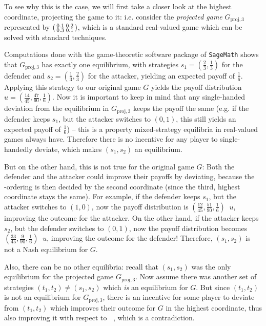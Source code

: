 \documentclass[a4paper]{scrreprt}
\DeclareMathOperator{\leqtail}{\leq_{\text{tail}}}
\DeclareMathOperator{\geqtail}{\geq_{\text{tail}}}
\begin{document}
    To see why this is the case, we will first take a closer look at the highest coordinate, projecting the game to it: i.e. consider the \emph{projected game} $G_{\text{proj},3}$ represented by $\left(\begin{smallmatrix}0.1 & 0.2 \\ 0.3 & 0.1\end{smallmatrix}\right)$, which is a standard real-valued game which can be solved with standard techniques.
    
    Computations done with the game-theoretic software package of \texttt{SageMath} %
    shows that $G_{\text{proj},3}$ has exactly one equilibrium, with strategies $s_1 = (\frac{2}{3}, \frac{1}{3})$ for the defender and $s_2 = (\frac{1}{3}, \frac{2}{3})$ for the attacker, yielding an expected payoff of $\frac{1}{6}$. Applying this strategy to our original game $G$ yields the payoff distribution $u = (\frac{14}{45}, \frac{47}{90}, \frac{1}{6})$. Now it is important to keep in mind that any single-handed deviation from the equilibrium in  $G_{\text{proj},3}$ keeps the payoff the same (e.g. if the defender keeps $s_1$, but the attacker switches to $(0, 1)$, this still yields an expected payoff of $\frac{1}{6}$) -- this is a property mixed-strategy equilibria in real-valued games always have. Therefore there is no incentive for any player to single-handedly deviate, which makes $(s_1, s_2)$ an equilibrium.
    
    But on the other hand, this is not true for the original game $G$: Both the defender and the attacker could improve their payoffs by deviating, because the $\leqtail$-ordering is then decided by the second coordinate (since the third, highest coordinate stays the same).
    For example, if the defender keeps $s_1$, but the attacker switches to $(1, 0)$, now the payoff distribution is $(\frac{12}{45}, \frac{51}{90}, \frac{1}{6}) \geqtail u$, improving the outcome for the attacker. On the other hand, if the attacker keeps $s_2$, but the defender switches to $(0, 1)$, now the payoff distribution becomes $(\frac{33}{45}, \frac{9}{90}, \frac{1}{6}) \leqtail u$, improving the outcome for the defender!
    Therefore, $(s_1, s_2)$ is not a Nash equilibrium for $G$.
    
    Also, there can be no other equilibria: recall that $(s_1, s_2)$ was the only equilibrium for the projected game $G_{\text{proj},3}$. Now assume there was another set of strategies $(t_1, t_2) \neq (s_1, s_2)$ which \emph{is} an equilibrium for $G$. But since $(t_1, t_2)$ is not an equilibrium for $G_{\text{proj},3}$, there is an incentive for some player to deviate from $(t_1, t_2)$ which improves their outcome for $G$ in the highest coordinate, thus also improving it with respect to $\leqtail$, which is a contradiction.
    
\end{document}
